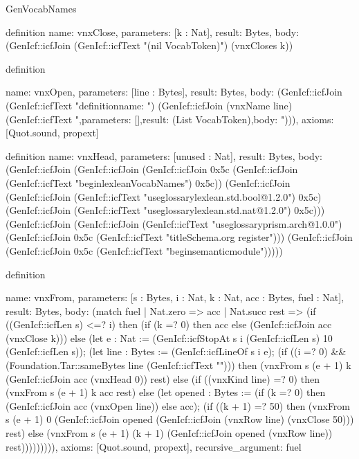 \begin{lexlean}{GenVocabNames}
\begin{semanticmodule}
definition{
  name: vnxClose,
  parameters: [k : Nat],
  result: Bytes,
  body: (GenIcf::icfJoin (GenIcf::icfText "(nil VocabToken)") (vnxCloses k))
}

definition{
  name: vnxOpen,
  parameters: [line : Bytes],
  result: Bytes,
  body: (GenIcf::icfJoin (GenIcf::icfText "definition{\n  name: ") (GenIcf::icfJoin (vnxName line) (GenIcf::icfText ",\n  parameters: [],\n  result: (List VocabToken),\n  body: "))),
  axioms: [Quot.sound, propext]
}

definition{
  name: vnxHead,
  parameters: [unused : Nat],
  result: Bytes,
  body: (GenIcf::icfJoin (GenIcf::icfJoin (GenIcf::icfJoin 0x5c (GenIcf::icfJoin (GenIcf::icfText "begin{lexlean}{VocabNames}\n") 0x5c)) (GenIcf::icfJoin (GenIcf::icfJoin (GenIcf::icfText "useglossary{lexlean.std.bool@1.2.0}\n") 0x5c) (GenIcf::icfJoin (GenIcf::icfText "useglossary{lexlean.std.nat@1.2.0}\n") 0x5c))) (GenIcf::icfJoin (GenIcf::icfJoin (GenIcf::icfText "useglossary{prism.arch@1.0.0}\n") (GenIcf::icfJoin 0x5c (GenIcf::icfText "title{Schema.org register}\n"))) (GenIcf::icfJoin (GenIcf::icfJoin 0x5c (GenIcf::icfText "begin{semanticmodule}\n{}\n\n")))))
}

definition{
  name: vnxFrom,
  parameters: [s : Bytes, i : Nat, k : Nat, acc : Bytes, fuel : Nat],
  result: Bytes,
  body: (match fuel
    | Nat.zero => acc
    | Nat.succ rest => (if ((GenIcf::icfLen s) <=? i) then (if (k =? 0) then acc else (GenIcf::icfJoin acc (vnxClose k))) else (let e : Nat := (GenIcf::icfStopAt s i (GenIcf::icfLen s) 10 (GenIcf::icfLen s)); (let line : Bytes := (GenIcf::icfLineOf s i e); (if ((i =? 0) && (Foundation.Tar::sameBytes line (GenIcf::icfText "{"))) then (vnxFrom s (e + 1) k (GenIcf::icfJoin acc (vnxHead 0)) rest) else (if ((vnxKind line) =? 0) then (vnxFrom s (e + 1) k acc rest) else (let opened : Bytes := (if (k =? 0) then (GenIcf::icfJoin acc (vnxOpen line)) else acc); (if ((k + 1) =? 50) then (vnxFrom s (e + 1) 0 (GenIcf::icfJoin opened (GenIcf::icfJoin (vnxRow line) (vnxClose 50))) rest) else (vnxFrom s (e + 1) (k + 1) (GenIcf::icfJoin opened (vnxRow line)) rest))))))))),
  axioms: [Quot.sound, propext],
  recursive_argument: fuel
}

}}
\end{semanticmodule}
\end{lexlean}
